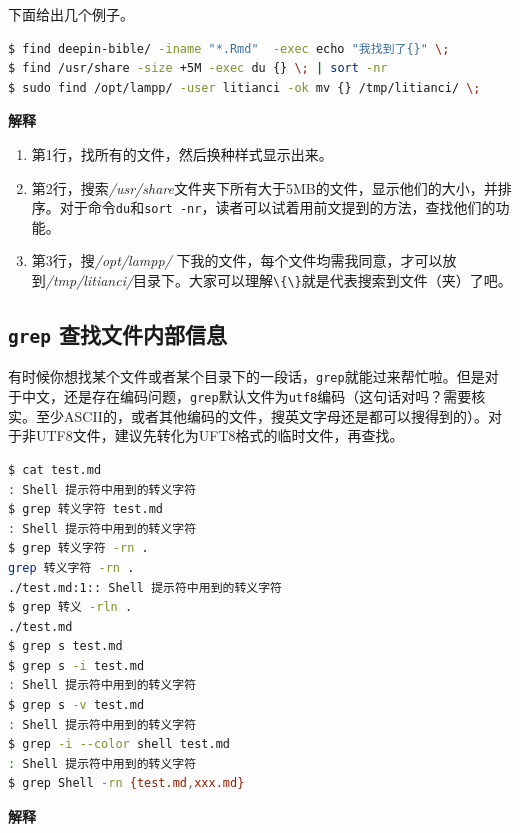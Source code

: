 \documentclass[doctor,openright,twoside]{sjtuthesis}
\providecommand{\tightlist}{%
    \setlength{\itemsep}{0pt}\setlength{\parskip}{0pt}}
\newcommand{\passthrough}[1]{#1}
\theoremstyle{plain}
\theoremstyle{definition}
\theoremstyle{remark}
\theoremstyle{ocrenumbox}
\theoremstyle{plain}
\begin{document}
下面给出几个例子。

\begin{lstlisting}[language=bash]
$ find deepin-bible/ -iname "*.Rmd"  -exec echo "我找到了{}" \;
$ find /usr/share -size +5M -exec du {} \; | sort -nr
$ sudo find /opt/lampp/ -user litianci -ok mv {} /tmp/litianci/ \;
\end{lstlisting}

\textbf{解释}

\begin{enumerate}
\def\labelenumi{\arabic{enumi}.}
\tightlist
\item
  第1行，找所有的文件，然后换种样式显示出来。
\item
  第2行，搜索\emph{/usr/share}文件夹下所有大于5MB的文件，显示他们的大小，并排序。对于命令\passthrough{\lstinline!du!}和\passthrough{\lstinline!sort -nr!}，读者可以试着用前文提到的方法，查找他们的功能。
\item
  第3行，搜\emph{/opt/lampp/} 下我的文件，每个文件均需我同意，才可以放到\emph{/tmp/litianci/}目录下。大家可以理解\passthrough{\lstinline!\{\}!}就是代表搜索到文件（夹）了吧。
\end{enumerate}

\hypertarget{grep-}{%
\subsection{\texorpdfstring{\texttt{grep} 查找文件内部信息}{grep 查找文件内部信息}}\label{grep-}}

有时候你想找某个文件或者某个目录下的一段话，\passthrough{\lstinline!grep!}就能过来帮忙啦。但是对于中文，还是存在编码问题，\passthrough{\lstinline!grep!}默认文件为\passthrough{\lstinline!utf8!}编码（这句话对吗？需要核实。至少ASCII的，或者其他编码的文件，搜英文字母还是都可以搜得到的）。对于非UTF8文件，建议先转化为UFT8格式的临时文件，再查找。

\begin{lstlisting}[language=bash]
$ cat test.md
: Shell 提示符中用到的转义字符
$ grep 转义字符 test.md
: Shell 提示符中用到的转义字符
$ grep 转义字符 -rn .
grep 转义字符 -rn .
./test.md:1:: Shell 提示符中用到的转义字符
$ grep 转义 -rln .
./test.md
$ grep s test.md
$ grep s -i test.md
: Shell 提示符中用到的转义字符
$ grep s -v test.md
: Shell 提示符中用到的转义字符
$ grep -i --color shell test.md
: Shell 提示符中用到的转义字符
$ grep Shell -rn {test.md,xxx.md}
\end{lstlisting}

\textbf{解释}
\end{document}
